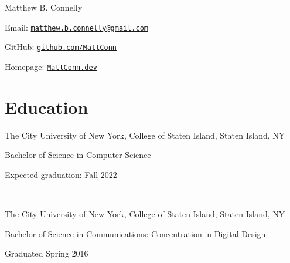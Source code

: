 \documentclass[letterpaper]{article}
\def\name{Matthew B. Connelly}
\renewenvironment{itemize}{
  \begin{list}{}{
    \setlength{\leftmargin}{1.5em}
  }
}{
  \end{list}
}
\begin{document}

\centerline{\huge \name}

\vspace{0.25in}

\begin{itemize}
  \item Email: \href{mailto:matthew.b.connelly@gmail.com}{\tt matthew.b.connelly@gmail.com}

  GitHub: \href{https://github.com/mattconn/}{\tt github.com/MattConn}

  Homepage: \href{https://mattconn.dev/}{\tt MattConn.dev}
\end{itemize}


\section*{Education}

\begin{itemize}
  \item The City University of New York, College of Staten Island, Staten Island, NY

  Bachelor of Science in Computer Science

  Expected graduation: Fall 2022

  \

  \item The City University of New York, College of Staten Island, Staten Island, NY

  Bachelor of Science in Communications: Concentration in Digital Design

  Graduated Spring 2016
\end{itemize}
\end{document}

